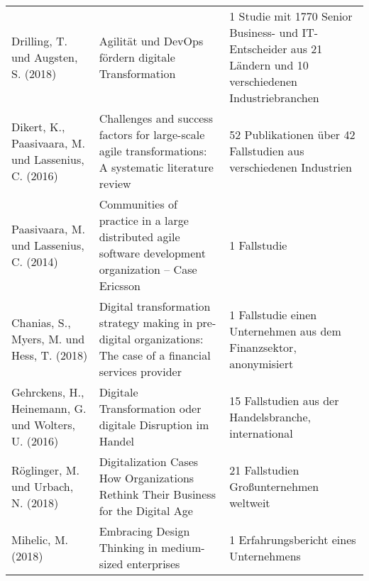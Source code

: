 \begin{table}[ht]
\begin{tabularx}{500px}{|X|X|X|}
		Drilling, T. und Augsten, S. (2018)                 & Agilität und DevOps fördern digitale Transformation                                                                                           & 1 Studie mit 1770 Senior Business- und IT-Entscheider aus 21 Ländern und 10 verschiedenen Industriebranchen \\
		Dikert, K., Paasivaara, M. und Lassenius, C. (2016) & Challenges and success factors for large-scale agile transformations: A systematic literature review                                          & 52 Publikationen über 42 Fallstudien aus verschiedenen Industrien                                           \\
		Paasivaara, M. und Lassenius, C. (2014)             & Communities of practice in a large distributed agile software development organization – Case Ericsson                                        & 1 Fallstudie                                                                                                \\
		Chanias, S., Myers, M. und Hess, T. (2018)          & Digital transformation strategy making in pre-digital organizations: The case of a financial services provider                                & 1 Fallstudie einen Unternehmen aus dem Finanzsektor, anonymisiert                                           \\
		Gehrckens, H., Heinemann, G. und Wolters, U. (2016) & Digitale Transformation oder digitale Disruption im Handel                                                                                    & 15 Fallstudien aus der Handelsbranche, international                                                        \\
		Röglinger, M. und Urbach, N. (2018)                 & Digitalization Cases How Organizations Rethink Their Business for the Digital Age                                                             & 21 Fallstudien Großunternehmen weltweit                                                                     \\
		Mihelic, M. (2018)                                  & Embracing Design Thinking in medium-sized enterprises                                                                                         & 1 Erfahrungsbericht eines Unternehmens                                                                      \\
		\hline                                                                                          
	\end{tabularx}
	\label{tab:overviewliterature2}
\end{table}

